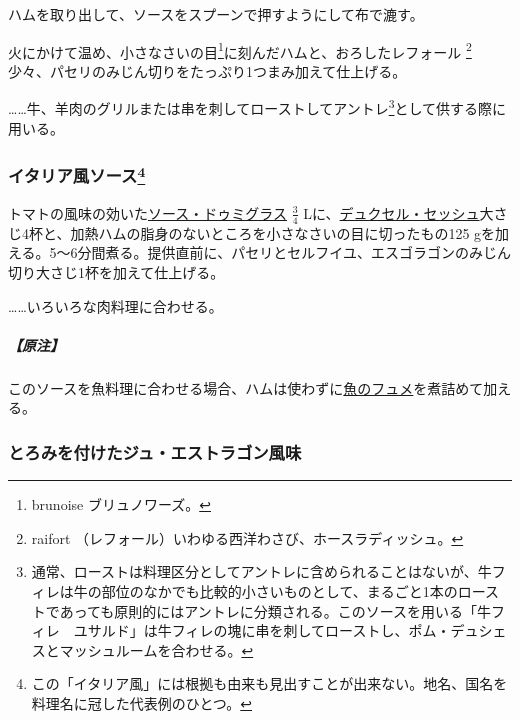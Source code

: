 \begin{recette}
ハムを取り出して、ソースをスプーンで押すようにして布で漉す。

火にかけて温め、小さなさいの目\footnote{brunoise ブリュノワーズ。}に刻んだハムと、おろしたレフォール
\footnote{raifort （レフォール）いわゆる西洋わさび、ホースラディッシュ。}少々、パセリのみじん切りをたっぷり1つまみ加えて仕上げる。

\ldots{}\ldots{}牛、羊肉のグリルまたは串を刺してローストしてアントレ\footnote{通常、ローストは料理区分としてアントレに含められることはないが、牛フィレは牛の部位のなかでも比較的小さいものとして、まるごと1本のローストであっても原則的にはアントレに分類される。このソースを用いる「牛フィレ　ユサルド」は牛フィレの塊に串を刺してローストし、ポム・デュシェスとマッシュルームを合わせる。}として供する際に用いる。

\atoaki{}

\hypertarget{sauce-italienne}{%
\subsubsection[イタリア風ソース]{\texorpdfstring{イタリア風ソース\footnote{この「イタリア風」には根拠も由来も見出すことが出来ない。地名、国名を料理名に冠した代表例のひとつ。}}{イタリア風ソース}}\label{sauce-italienne}}


 

トマトの風味の効いた\protect\hyperlink{sauce-demi-glace}{ソース・ドゥミグラス}
\(\frac{3}{4}\)
Lに、\protect\hyperlink{duxelles-seche}{デュクセル・セッシュ}大さじ4杯と、加熱ハムの脂身のないところを小さなさいの目に切ったもの125
gを加える。5〜6分間煮る。提供直前に、パセリとセルフイユ、エスゴラゴンのみじん切り大さじ1杯を加えて仕上げる。

\ldots{}\ldots{}いろいろな肉料理に合わせる。

\hypertarget{nota-sauce-italienne}{%
\subparagraph{【原注】}\label{nota-sauce-italienne}}

このソースを魚料理に合わせる場合、ハムは使わずに\protect\hyperlink{fumet-de-poisson}{魚のフュメ}を煮詰めて加える。

\atoaki{}

\hypertarget{jus-lie-estragon}{%
\subsubsection{とろみを付けたジュ・エストラゴン風味}\label{jus-lie-estragon}}


\end{recette}
